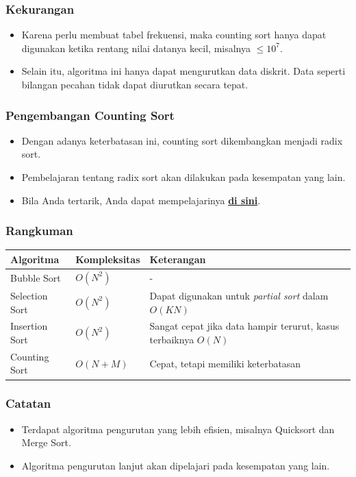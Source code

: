 \begin{frame}
\frametitle{Kekurangan}
  \begin{itemize}
    \item Karena perlu membuat tabel frekuensi, maka counting sort hanya dapat digunakan ketika rentang nilai datanya kecil, misalnya $\le 10^7$.
    \item Selain itu, algoritma ini hanya dapat mengurutkan data diskrit. Data seperti bilangan pecahan tidak dapat diurutkan secara tepat.
  \end{itemize}
\end{frame}

\begin{frame}
\frametitle{Pengembangan Counting Sort}
  \begin{itemize}
    \item Dengan adanya keterbatasan ini, counting sort dikembangkan
    menjadi radix sort.
    \item Pembelajaran tentang radix sort akan dilakukan pada
    kesempatan yang lain.
    \item Bila Anda tertarik, Anda dapat mempelajarinya \href{https://en.wikipedia.org/wiki/Radix_sort}{\textbf{di sini}}.
  \end{itemize}
\end{frame}

\begin{frame}
\frametitle{Rangkuman}
  \begin{table}[ht]
    \begin{tabular}{|l|l|p{5 cm}|}
      \hline Algoritma  & Kompleksitas & Keterangan \\
      \hline Bubble Sort & $O(N^2)$ & - \\
      \hline Selection Sort & $O(N^2)$ & Dapat digunakan untuk \textit{partial sort} dalam $O(KN)$ \\
      \hline Insertion Sort & $O(N^2)$ & Sangat cepat jika data hampir terurut, kasus terbaiknya $O(N)$ \\
      \hline Counting Sort & $O(N+M)$ & Cepat, tetapi memiliki keterbatasan \\
      \hline
    \end{tabular}
  \end{table}
\end{frame}

\begin{frame}
\frametitle{Catatan}
  \begin{itemize}
    \item Terdapat algoritma pengurutan yang lebih efisien, misalnya Quicksort dan Merge Sort.
    \item Algoritma pengurutan lanjut akan dipelajari pada kesempatan yang lain.
  \end{itemize}
\end{frame}


